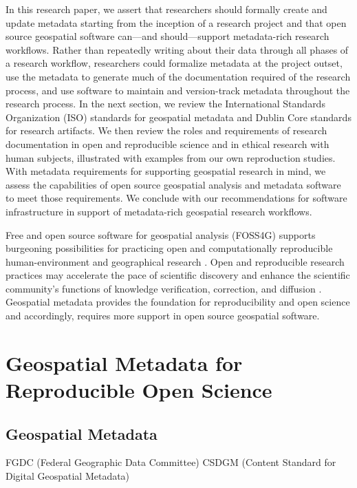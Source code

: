 \documentclass{isprs} %
\begin{document}
In this research paper, we assert that researchers should formally create and update metadata starting from the inception of a research project and that open source geospatial software can---and should---support metadata-rich research workflows.
Rather than repeatedly writing about their data through all phases of a research workflow, researchers could formalize metadata at the project outset, use the metadata to generate much of the documentation required of the research process, and use software to maintain and version-track metadata throughout the research process.
In the next section, we review the International Standards Organization (ISO) standards for geospatial metadata and Dublin Core standards for research artifacts. We then review the roles and requirements of research documentation in open and reproducible science and in ethical research with human subjects, illustrated with examples from our own reproduction studies.
With metadata requirements for supporting geospatial research in mind, we assess the capabilities of open source geospatial analysis and metadata software to meet those requirements. We conclude with our recommendations for software infrastructure in support of metadata-rich geospatial research workflows.

Free and open source software for geospatial analysis (FOSS4G) supports burgeoning possibilities for practicing open and computationally reproducible human-environment and geographical research \citet{Singleton2016}.
Open and reproducible research practices may accelerate the pace of scientific discovery and enhance the scientific community's functions of knowledge verification, correction, and diffusion \citep{Rey2009,Kedron2022}.
Geospatial metadata provides the foundation for reproducibility and open science and accordingly, requires more support in open source geospatial software.

\section{Geospatial Metadata for Reproducible Open Science}\label{sec:Background}

\subsection{Geospatial Metadata}\label{sec:Metadata}

FGDC (Federal Geographic Data Committee) CSDGM (Content Standard for Digital Geospatial Metadata)
\end{document}
